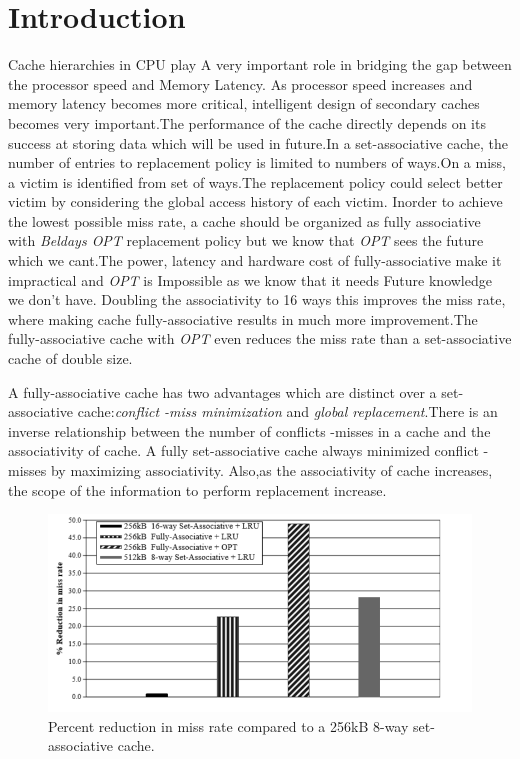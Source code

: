 \documentclass{report}
\begin{document}
\section{Introduction}
Cache hierarchies in CPU play A very important role in bridging
the gap between the processor speed and Memory Latency. As
processor speed increases and memory latency becomes more critical, intelligent design of secondary caches becomes very important.The performance of the cache directly depends on its success at storing data which will be used in future.In a set-associative cache, the number of entries to replacement policy is limited to numbers of ways.On a miss, a victim is identified from set of ways.The replacement policy could 
\vspace{.8cm}
select better victim by considering the global access history of each victim.
Inorder to achieve the lowest possible miss rate, a cache should be organized as fully associative with \emph{Beldays OPT} replacement policy but we know that  \emph{OPT} sees the future which we cant.The power, latency and hardware cost of fully-associative make it impractical and  \emph{OPT} is Impossible as we know that it needs Future knowledge we don't have.
Doubling the associativity to 16 ways this improves the miss rate, where making cache  fully-associative results in much more improvement.The fully-associative cache with 
\emph{OPT} even reduces the miss rate than \vspace{.8cm}a set-associative cache of double size.


A fully-associative cache has two advantages which are distinct over a set-associative cache:\emph{conflict -miss minimization } and \emph{global replacement}.There is an inverse relationship between the number of conflicts -misses in a cache and the associativity of cache. A fully set-associative cache always minimized conflict -misses by maximizing associativity. Also,as the associativity of cache increases, the scope of the information to perform replacement increase.

\begin{figure}[t]
\includegraphics[width=1\textwidth]{./fig1}
\caption{Percent reduction in miss rate compared to a 256kB 8-way set-associative cache.}
\label{fig1}
\end{figure}
\end{document}
